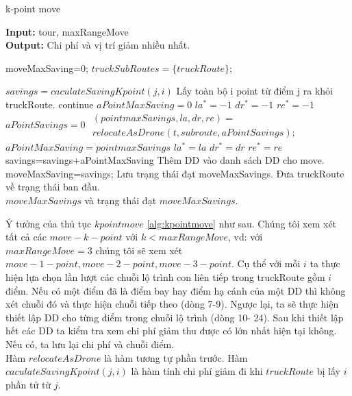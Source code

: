 \documentclass[a4paper,12pt]{report}
\begin{document}
\begin{algorithm}[H]

\caption{k-point move}
\textbf{Input:} tour, maxRangeMove\\
\textbf{Output:} Chi phí và vị trí giảm nhiều nhất.

\begin{algorithmic}[1]
\State moveMaxSaving=0;
\State $truckSubRoutes = \{truckRoute\};$

\State $savings=caculateSavingKpoint(j,i)$
\State Lấy toàn bộ i point từ điểm j ra khỏi truckRoute.
\State continue
\EndIf
{}
\State $aPointMaxSaving=0$
\State $la^*=-1$
\State $dr^*=-1$
\State $re^*=-1$
\State $aPointSavings=0$
\State $\begin{array}{l}

(pointmaxSavings,la,dr,re)= \\ relocateAsDrone(t,subroute,aPointSavings);\end{array}$
\State $aPointMaxSaving=pointmaxSavings$
\State $la^*=la$
\State $dr^*=dr$
\State $re^*=re$
\EndIf
\EndFor	
\State savings=savings+aPointMaxSaving
\State Thêm \ac{DD} vào danh sách \ac{DD} cho move.
\EndFor
\State moveMaxSaving=savings;
\State Lưu trạng thái đạt moveMaxSavings.
\EndIf
\State Đưa truckRoute về trạng thái ban đầu.
\EndFor
\EndFor\\
\Return $moveMaxSavings$ và trạng thái đạt $moveMaxSavings$.
\end{algorithmic}
\label{alg:kpointmove}
\end{algorithm}
Ý tưởng của thủ tục $kpointmove$ \ref{alg:kpointmove} như sau. Chúng tôi xem xét tất cả các $move-k-point$ với $k<maxRangeMove$, vd: với $maxRangeMove=3$ chúng tôi sẽ xem xét $move-1-point,move-2-point,move-3-point$. 
Cụ thể với mỗi $i$ ta thực hiện lựa chọn lần lượt các chuỗi lộ trình con liên tiếp trong truckRoute gồm $i$ điểm. Nếu có một điểm đã là điểm bay hay điểm hạ cánh của một \ac{DD} thì không xét chuỗi đó và thực hiện chuỗi tiếp theo (dòng 7-9). Ngược lại, ta sẽ thực hiện thiết lập \ac{DD} cho từng điểm trong chuỗi lộ trình (dòng 10- 24). Sau khi thiết lập hết các \ac{DD} ta kiểm tra xem chi phí giảm thu được có lớn nhất hiện tại không. Nếu có, ta lưu lại chi phí và chuỗi điểm. \\
 Hàm $relocateAsDrone$ là hàm tương tự phần trước. Hàm $caculateSavingKpoint(j,i)$ là hàm tính chi phí giảm đi khi $truckRoute$ bị lấy $i$ phần tử từ $j$.
\end{document}
